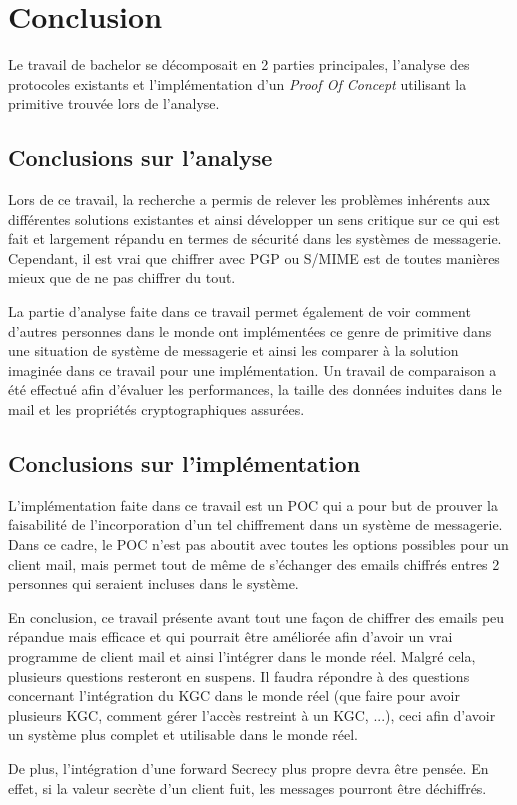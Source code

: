 \chapter{Conclusion}
\label{ch:conclusion}
Le travail de bachelor se décomposait en 2 parties principales, l'analyse des protocoles existants et l'implémentation d'un \textit{Proof Of Concept} utilisant la primitive trouvée lors de l'analyse.
\section{Conclusions sur l'analyse}
Lors de ce travail, la recherche a permis de relever les problèmes inhérents aux différentes solutions existantes et ainsi développer un sens critique sur ce qui est fait et largement répandu en termes de sécurité dans les systèmes de messagerie. Cependant, il est vrai que chiffrer avec PGP ou S/MIME est de toutes manières mieux que de ne pas chiffrer du tout.

La partie d'analyse faite dans ce travail permet également de voir comment d'autres personnes dans le monde ont implémentées ce genre de primitive dans une situation de système de messagerie et ainsi les comparer à la solution imaginée dans ce travail pour une implémentation. Un travail de comparaison a été effectué afin d'évaluer les performances, la taille des données induites dans le mail et les propriétés cryptographiques assurées.
\section{Conclusions sur l'implémentation}
L'implémentation faite dans ce travail est un POC qui a pour but de prouver la faisabilité de l'incorporation d'un tel chiffrement dans un système de messagerie. Dans ce cadre, le POC n'est pas aboutit avec toutes les options possibles pour un client mail, mais permet tout de même de s'échanger des emails chiffrés entres 2 personnes qui seraient incluses dans le système.

En conclusion, ce travail présente avant tout une façon de chiffrer des emails peu répandue mais efficace et qui pourrait être améliorée afin d'avoir un vrai programme de client mail et ainsi l'intégrer dans le monde réel. Malgré cela, plusieurs questions resteront en suspens. Il faudra répondre à des questions concernant l'intégration du KGC dans le monde réel (que faire pour avoir plusieurs KGC, comment gérer l'accès restreint à un KGC, ...), ceci afin d'avoir un système plus complet et utilisable dans le monde réel.

De plus, l'intégration d'une forward Secrecy plus propre devra être pensée. En effet, si la valeur secrète d'un client fuit, les messages pourront être déchiffrés.